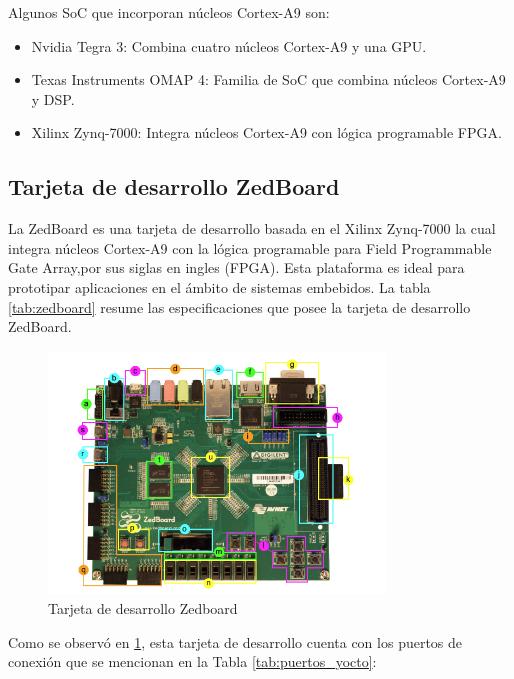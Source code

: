 Algunos SoC que incorporan núcleos Cortex-A9 son:

\begin{itemize}
    \item Nvidia Tegra 3: Combina cuatro núcleos Cortex-A9 y una GPU.
    \item Texas Instruments OMAP 4: Familia de SoC que combina núcleos Cortex-A9 y DSP.
    \item Xilinx Zynq-7000: Integra núcleos Cortex-A9 con lógica programable FPGA.
\end{itemize}

\subsection{Tarjeta de desarrollo ZedBoard}

La ZedBoard es una tarjeta de desarrollo basada en el Xilinx Zynq-7000 la cual integra núcleos Cortex-A9 con la lógica programable para Field Programmable Gate Array,por sus siglas en ingles (FPGA). Esta plataforma es ideal para prototipar aplicaciones en el ámbito de sistemas embebidos. La tabla \ref{tab:zedboard} resume las especificaciones que posee la tarjeta de desarrollo ZedBoard.


\begin{figure}[h!]
    \centering
    \includegraphics[width=0.8\textwidth]{fig/teorico/zedboard_raw.png}
    \caption{Tarjeta de desarrollo Zedboard}
    \label{fig:zedboard_raw_info}
\end{figure}

Como se observó en \ref{fig:zedboard_raw_info}, esta tarjeta de desarrollo cuenta con los puertos de conexión que se mencionan en la Tabla \ref{tab:puertos_yocto}: 

